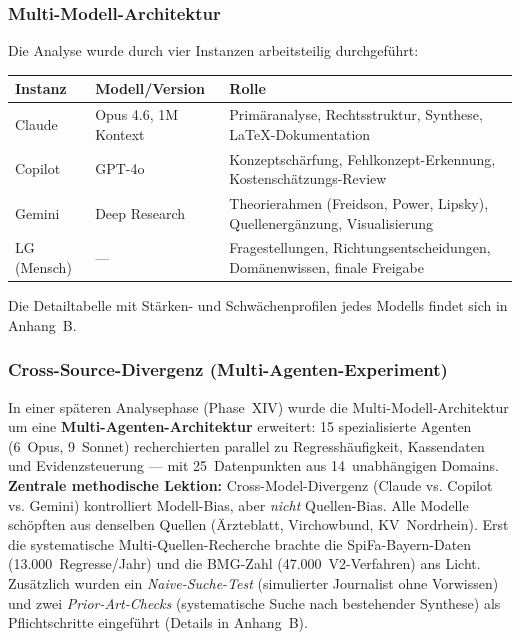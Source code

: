 \documentclass{umbruch-position}
\begin{document}
\subsubsection{Multi-Modell-Architektur}

Die Analyse wurde durch vier Instanzen arbeitsteilig durchgeführt:

\begin{tabular}{p{2.2cm}p{3.3cm}p{7cm}}
\textbf{Instanz} & \textbf{Modell/Version} & \textbf{Rolle} \\
\hline
Claude & Opus 4.6, 1M Kontext & Primäranalyse, Rechtsstruktur, Synthese, LaTeX-Dokumentation \\
Copilot & GPT-4o & Konzeptschärfung, Fehlkonzept-Erkennung, Kostenschätzungs-Review \\
Gemini & Deep Research & Theorierahmen (Freidson, Power, Lipsky), Quellenergänzung, Visualisierung \\
LG (Mensch) & --- & Fragestellungen, Richtungsentscheidungen, Domänenwissen, finale Freigabe \\
\end{tabular}

\vspace{0.3em}
\noindent Die Detailtabelle mit Stärken- und Schwächenprofilen jedes Modells findet sich in Anhang~B.

\subsubsection{Cross-Source-Divergenz (Multi-Agenten-Experiment)}

In einer späteren Analysephase (Phase~XIV) wurde die Multi-Modell-Architektur um eine \textbf{Multi-Agenten-Architektur} erweitert: 15 spezialisierte Agenten (6~Opus, 9~Sonnet) recherchierten parallel zu Regresshäufigkeit, Kassendaten und Evidenzsteuerung --- mit 25~Datenpunkten aus 14~unabhängigen Domains. \textbf{Zentrale methodische Lektion:} Cross-Model-Divergenz (Claude vs. Copilot vs. Gemini) kontrolliert Modell-Bias, aber \textit{nicht} Quellen-Bias. Alle Modelle schöpften aus denselben Quellen (Ärzteblatt, Virchowbund, KV~Nordrhein). Erst die systematische Multi-Quellen-Recherche brachte die SpiFa-Bayern-Daten (13.000~Regresse/Jahr) und die BMG-Zahl (47.000~V2-Verfahren) ans Licht. Zusätzlich wurden ein \textit{Naive-Suche-Test} (simulierter Journalist ohne Vorwissen) und zwei \textit{Prior-Art-Checks} (systematische Suche nach bestehender Synthese) als Pflichtschritte eingeführt (Details in Anhang~B).
\end{document}
